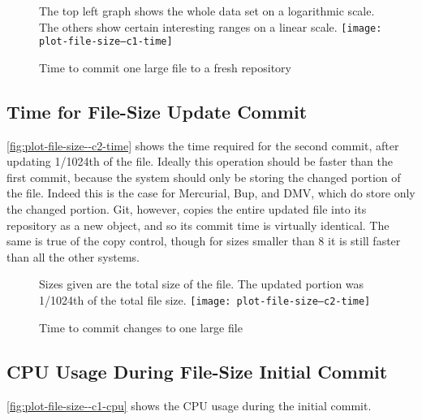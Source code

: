 
\begin{figure}[]
    \caption{Time to commit one large file to a fresh repository}
    \label{fig:plot-file-size--c1-time}
    \centering
    The top left graph shows the whole data set on a logarithmic scale. The
    others show certain interesting ranges on a linear scale.
    \texttt{[image: plot-file-size--c1-time]}
\end{figure}

%


\subsection{Time for File-Size Update Commit}

\autoref{fig:plot-file-size--c2-time} shows the time required for the second
\gls{commit}, after updating \num{1/1024}th of the file. Ideally this operation
should be faster than the first \gls{commit}, because the system should only be
storing the changed portion of the file. Indeed this is the case for Mercurial,
Bup, and \gls{DMV}, which do store only the changed portion. Git, however,
copies the entire updated file into its repository as a new object, and so its
\gls{commit} time is virtually identical. The same is true of the copy control,
though for sizes smaller than \SI{8}{\gib} it is still faster than all the other
systems.


\begin{figure}[]
    \caption{Time to commit changes to one large file}
    \label{fig:plot-file-size--c2-time}
    \centering
    Sizes given are the total size of the file. The updated portion was
    \num{1/1024}th of the total file size.
    \texttt{[image: plot-file-size--c2-time]}
\end{figure}

%


\subsection{CPU Usage During File-Size Initial Commit}

\autoref{fig:plot-file-size--c1-cpu} shows the
CPU usage during the initial \gls{commit}.



